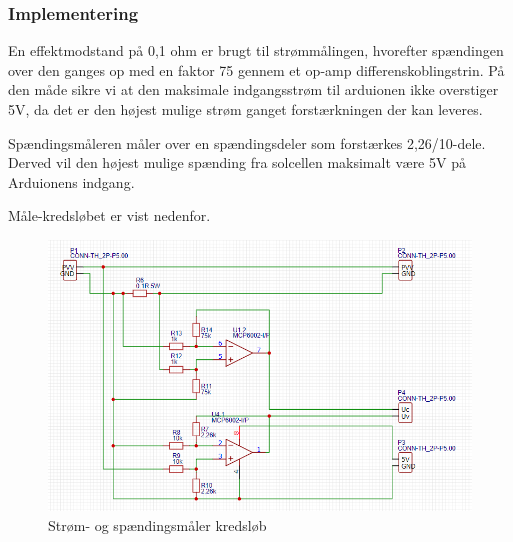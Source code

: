 \documentclass[../main.tex]{subfiles}
\begin{document}
        \subsubsection{Implementering}

        En effektmodstand på 0,1 ohm er brugt til strømmålingen, hvorefter spændingen over den ganges op med en faktor 75 gennem et op-amp differenskoblingstrin. På den måde sikre vi at den maksimale indgangsstrøm til arduionen ikke overstiger 5V, da det er den højest mulige strøm ganget forstærkningen der kan leveres.

        Spændingsmåleren måler over en spændingsdeler som forstærkes 2,26/10-dele. Derved vil den højest mulige spænding fra solcellen maksimalt være 5V på Arduionens indgang.

        Måle-kredsløbet er vist nedenfor. 
        

        \begin{figure}[H]
        \includegraphics[width=\textwidth]{Dokumentation/målekredsløb.png}
        \caption{Strøm- og spændingsmåler kredsløb}
        \label{fig: Strøm- og spændingsmåler kredsløb}
        \end{figure}
        
\end{document}
